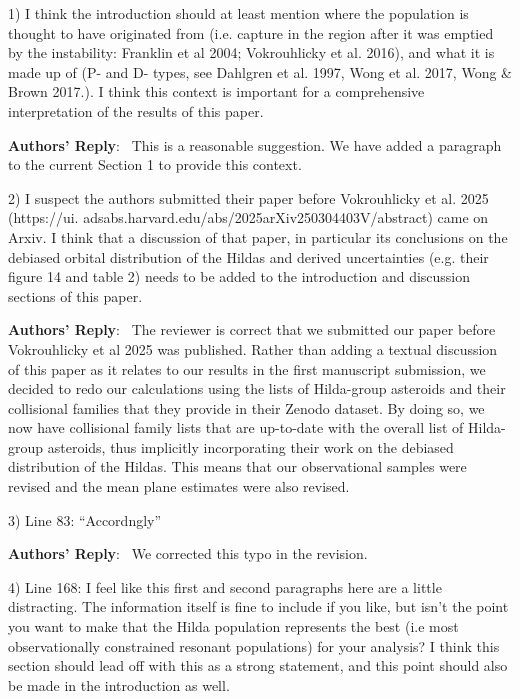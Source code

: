 \documentclass[11pt]{article}
\newcounter{reviewer}
\newcounter{point}[reviewer]
\newenvironment{reply}
   {\medskip \noindent \begin{sf}\textbf{Authors' Reply}:\  }
   {\medskip \end{sf}\medskip}
\begin{document}
1) I think the introduction should at least mention where the population is thought to have originated from (i.e. capture in the region after it was emptied by the instability: Franklin et al 2004; Vokrouhlicky et al. 2016), and what it is made up of (P- and D- types, see Dahlgren et al. 1997, Wong et al. 2017, Wong \& Brown 2017.). I think this context is important for a comprehensive interpretation of the results of this paper.

\begin{reply}
This is a reasonable suggestion. We have added a paragraph to the current Section 1 to provide this context.
\end{reply}

2) I suspect the authors submitted their paper before Vokrouhlicky et al. 2025 (https://ui.
adsabs.harvard.edu/abs/2025arXiv250304403V/abstract) came on Arxiv. I think that a discussion of that paper, in particular its conclusions on the debiased orbital distribution of the Hildas and derived uncertainties (e.g. their figure 14 and table 2) needs to be added to the introduction and discussion sections of this paper.

\begin{reply}
The reviewer is correct that we submitted our paper before Vokrouhlicky et al 2025 was published. 
Rather than adding a textual discussion of this paper as it relates to our results in the first manuscript submission, we decided to redo our calculations using the lists of Hilda-group asteroids and their collisional families that they provide in their Zenodo dataset. 
By doing so, we now have collisional family lists that are up-to-date with the overall list of Hilda-group asteroids, thus implicitly incorporating their work on the debiased distribution of the Hildas.
This means that our observational samples were revised and the mean plane estimates were also revised.
\end{reply}

3) Line 83: ``Accordngly''

\begin{reply}
We corrected this typo in the revision.
\end{reply}

4) Line 168: I feel like this first and second paragraphs here are a little distracting. The information itself is fine to include if you like, but isn't the point you want to make that the Hilda population represents the best (i.e most observationally constrained resonant populations) for your analysis? I think this section should lead off with this as a strong statement, and this point should also be made in the introduction as well.
\end{document}
